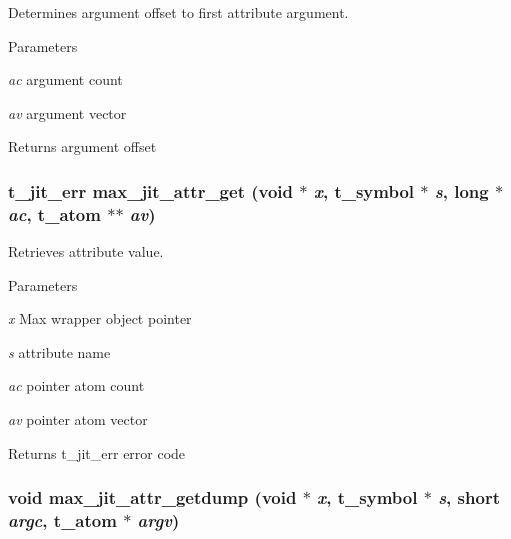 Determines argument offset to first attribute argument. 
\begin{DoxyParams}{Parameters}
\item[{\em ac}]argument count \item[{\em av}]argument vector\end{DoxyParams}
\begin{DoxyReturn}{Returns}
argument offset 
\end{DoxyReturn}
\hypertarget{group__maxwrapmod_ga842f21afa3ec44bf8c625eb21430fbad}{
\subsubsection[{max\_\-jit\_\-attr\_\-get}]{\setlength{\rightskip}{0pt plus 5cm}t\_\-jit\_\-err max\_\-jit\_\-attr\_\-get (void $\ast$ {\em x}, \/  {\bf t\_\-symbol} $\ast$ {\em s}, \/  long $\ast$ {\em ac}, \/  {\bf t\_\-atom} $\ast$$\ast$ {\em av})}}
\label{group__maxwrapmod_ga842f21afa3ec44bf8c625eb21430fbad}


Retrieves attribute value. 
\begin{DoxyParams}{Parameters}
\item[{\em x}]Max wrapper object pointer \item[{\em s}]attribute name \item[{\em ac}]pointer atom count \item[{\em av}]pointer atom vector\end{DoxyParams}
\begin{DoxyReturn}{Returns}
t\_\-jit\_\-err error code 
\end{DoxyReturn}
\hypertarget{group__maxwrapmod_ga2c14234e428260001a4b5ae40eb07525}{
\subsubsection[{max\_\-jit\_\-attr\_\-getdump}]{\setlength{\rightskip}{0pt plus 5cm}void max\_\-jit\_\-attr\_\-getdump (void $\ast$ {\em x}, \/  {\bf t\_\-symbol} $\ast$ {\em s}, \/  short {\em argc}, \/  {\bf t\_\-atom} $\ast$ {\em argv})}}
\label{group__maxwrapmod_ga2c14234e428260001a4b5ae40eb07525}


